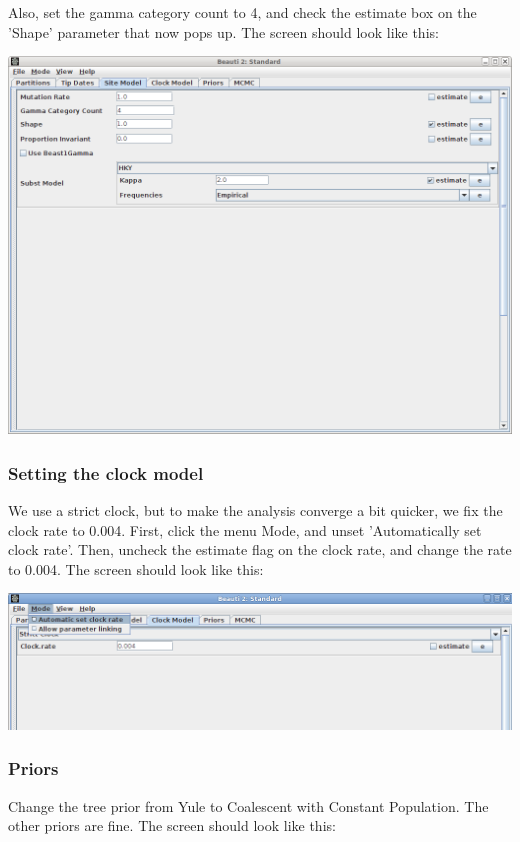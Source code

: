 \documentclass{article}
\begin{document}
Also, set the gamma category count to 4, and check the estimate box on the 'Shape' parameter that now pops up.
The screen should look like this:

\includegraphics[scale=0.4]{figures/BEAUti_sitemodel.png}

\subsubsection*{Setting the clock model}

We use a strict clock, but to make the analysis converge a bit quicker, we fix the clock rate to 0.004.
First, click the menu Mode, and unset 'Automatically set clock rate'. Then, uncheck the estimate flag on the clock rate, and change the rate to 0.004.
The screen should look like this:

\includegraphics[scale=0.4]{figures/BEAUti_clockmodel.png}


\subsubsection*{Priors}

Change the tree prior from Yule to Coalescent with Constant Population. The other priors are fine. The screen should look like this:
\end{document}
